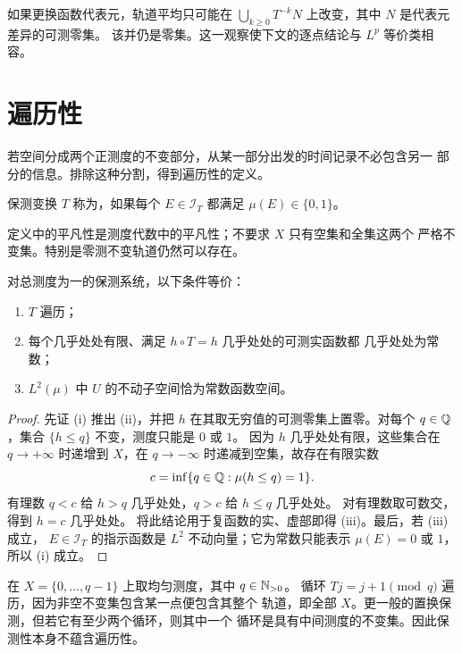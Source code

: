 如果更换函数代表元，轨道平均只可能在
$\bigcup_{k\ge0}T^{-k}N$ 上改变，其中 $N$ 是代表元差异的可测零集。
该并仍是零集。这一观察使下文的逐点结论与 $L^p$ 等价类相容。

\section{遍历性}
\label{sec:ergodicity}

若空间分成两个正测度的不变部分，从某一部分出发的时间记录不必包含另一
部分的信息。排除这种分割，得到遍历性的定义。

\begin{definition}\label{def:ergodicity}
保测变换 $T$ 称为，如果每个 $E\in\mathcal I_T$ 都满足
$\mu(E)\in\{0,1\}$。
\end{definition}

定义中的平凡性是测度代数中的平凡性；不要求 $X$ 只有空集和全集这两个
严格不变集。特别是零测不变轨道仍然可以存在。

\begin{proposition}\label{prop:ergodicity-fixed-functions}
对总测度为一的保测系统，以下条件等价：
\begin{enumerate}[label=\textup{(\roman*)}]
 \item $T$ 遍历；
 \item 每个几乎处处有限、满足 $h\circ T=h$ 几乎处处的可测实函数都
 几乎处处为常数；
 \item $L^2(\mu)$ 中 $U$ 的不动子空间恰为常数函数空间。
\end{enumerate}
\end{proposition}
\begin{proof}
先证 (i) 推出 (ii)，并把 $h$ 在其取无穷值的可测零集上置零。对每个
$q\in\mathbb{Q}$，集合 $\{h\le q\}$ 不变，测度只能是 $0$ 或 $1$。
因为 $h$ 几乎处处有限，这些集合在 $q\to+\infty$ 时递增到 $X$，在
$q\to-\infty$ 时递减到空集，故存在有限实数
\[
 c=\inf\{q\in\mathbb{Q}:\mu(h\le q)=1\}.
\]
有理数 $q<c$ 给 $h>q$ 几乎处处，$q>c$ 给 $h\le q$ 几乎处处。
对有理数取可数交，得到 $h=c$ 几乎处处。
将此结论用于复函数的实、虚部即得 (iii)。最后，若 (iii) 成立，
$E\in\mathcal I_T$ 的指示函数是 $L^2$ 不动向量；它为常数只能表示
$\mu(E)=0$ 或 $1$，所以 (i) 成立。
\end{proof}

\begin{example}\label{ex:ergodic-finite-cycle}
在 $X=\{0,\ldots,q-1\}$ 上取均匀测度，其中 $q\in\mathbb{N}_{>0}$。
循环 $Tj=j+1\pmod q$ 遍历，因为非空不变集包含某一点便包含其整个
轨道，即全部 $X$。更一般的置换保测，但若它有至少两个循环，则其中一个
循环是具有中间测度的不变集。因此保测性本身不蕴含遍历性。
\end{example}

